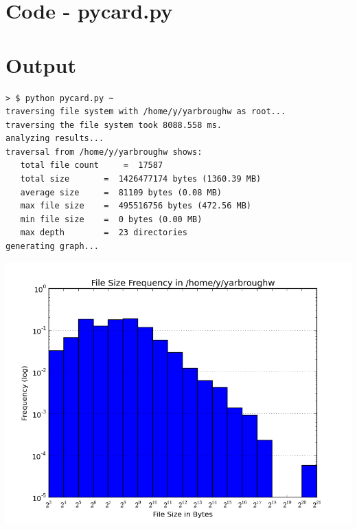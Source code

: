 
\usepackage{listings}

\lstset{
  breaklines=true,
  showstringspaces=false,
  basicstyle=\footnotesize\ttfamily
}



\MYHEADERS
{} 

\section{Code - pycard.py}


\newpage
\section{Output}

\begin{lstlisting}
> $ python pycard.py ~ 
traversing file system with /home/y/yarbroughw as root...
traversing the file system took 8088.558 ms.
analyzing results...
traversal from /home/y/yarbroughw shows:
   total file count 	=  17587
   total size 		=  1426477174 bytes (1360.39 MB)
   average size 	=  81109 bytes (0.08 MB)
   max file size 	=  495516756 bytes (472.56 MB)
   min file size 	=  0 bytes (0.00 MB)
   max depth 		=  23 directories
generating graph...

\end{lstlisting}

\includegraphics[scale=0.7]{assets/pycard-graph-1.png}

\newpage


